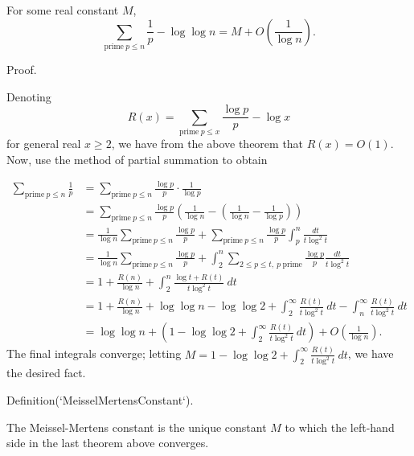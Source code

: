 \documentclass{article}
\begin{document}
For some real constant $M$,
$$
\sum_{\textrm{prime}\ p \le n} \frac{1}{p} - \log \log n = M + O\left(\frac{1}{\log n}\right).
$$

Proof.

Denoting
$$
R(x) = \sum_{\textrm{prime}\ p \le x} \frac{\log p}{p} - \log x
$$
for general real $x \ge 2$, we have from the above theorem that $R(x) = O(1)$. Now, use the method of partial summation to obtain

$$
\begin{align*}
\sum_{\textrm{prime}\ p \le n} \frac{1}{p}
&= \sum_{\textrm{prime}\ p \le n} \frac{\log p}{p} \cdot \frac{1}{\log p} \\
&= \sum_{\textrm{prime}\ p \le n} \frac{\log p}{p} \left( \frac{1}{\log n} - \left(\frac{1}{\log n} - \frac{1}{\log p}\right) \right) \\
&= \frac{1}{\log n} \sum_{\textrm{prime}\ p \le n} \frac{\log p}{p} + \sum_{\textrm{prime}\ p \le n} \frac{\log p}{p} \int_p^n \frac{dt}{t \log^2 t} \\
&= \frac{1}{\log n} \sum_{\textrm{prime}\ p \le n} \frac{\log p}{p} + \int_2^n \sum_{2 \le p \le t,\ p\ \textrm{prime}} \frac{\log p}{p} \frac{dt}{t \log^2 t} \\
&= 1 + \frac{R(n)}{\log n} + \int_2^n \frac{\log t + R(t)}{t \log^2 t} \ dt \\
&= 1 + \frac{R(n)}{\log n} + \log \log n - \log \log 2 + \int_2^\infty \frac{R(t)}{t \log^2 t} \ dt - \int_n^\infty \frac{R(t)}{t \log^2 t} \ dt \\
&= \log \log n + \left(1 - \log \log 2 + \int_2^\infty \frac{R(t)}{t \log^2 t} \ dt\right) + O\left(\frac{1}{\log n}\right).
\end{align*}
$$
The final integrals converge; letting $M = 1 - \log \log 2 + \int_2^\infty \frac{R(t)}{t \log^2 t} \ dt$, we have the desired fact.

Definition(`MeisselMertensConstant`).

The Meissel-Mertens constant is the unique constant $M$ to which the left-hand side in the last theorem above converges.
\end{document}
